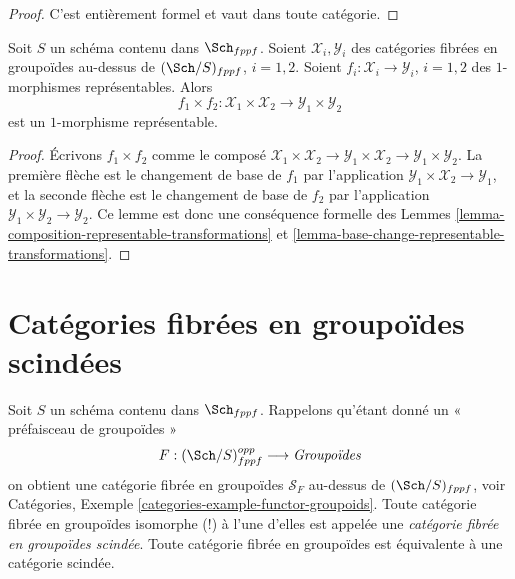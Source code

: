 \begin{proof}
C'est entièrement formel et vaut dans toute catégorie.
\end{proof}

\begin{lemma}
\label{lemma-product-representable-transformations}
Soit $S$ un schéma contenu dans $\Sch_{fppf}$.
Soient $\mathcal{X}_i, \mathcal{Y}_i$ des catégories fibrées en groupoïdes au-dessus de
$(\Sch/S)_{fppf}$, $i = 1, 2$.
Soient $f_i : \mathcal{X}_i \to \mathcal{Y}_i$, $i = 1, 2$
des $1$-morphismes représentables.
Alors
$$
f_1 \times f_2 :
\mathcal{X}_1 \times \mathcal{X}_2
\longrightarrow
\mathcal{Y}_1 \times \mathcal{Y}_2
$$
est un $1$-morphisme représentable.
\end{lemma}

\begin{proof}
Écrivons $f_1 \times f_2$ comme le composé
$\mathcal{X}_1 \times \mathcal{X}_2 \to
\mathcal{Y}_1 \times \mathcal{X}_2 \to
\mathcal{Y}_1 \times \mathcal{Y}_2$.
La première flèche est le changement de base de $f_1$ par l'application
$\mathcal{Y}_1 \times \mathcal{X}_2 \to \mathcal{Y}_1$, et la seconde flèche
est le changement de base de $f_2$ par l'application
$\mathcal{Y}_1 \times \mathcal{Y}_2 \to \mathcal{Y}_2$.
Ce lemme est donc une conséquence formelle des Lemmes
\ref{lemma-composition-representable-transformations}
et \ref{lemma-base-change-representable-transformations}.
\end{proof}



\section{Catégories fibrées en groupoïdes scindées}
\label{section-split}

\noindent
Soit $S$ un schéma contenu dans $\Sch_{fppf}$.
Rappelons qu'étant donné un « préfaisceau de groupoïdes »
$$
F : (\Sch/S)_{fppf}^{opp} \longrightarrow \textit{Groupoïdes}
$$
on obtient une catégorie fibrée en groupoïdes $\mathcal{S}_F$ au-dessus de
$(\Sch/S)_{fppf}$, voir
Catégories, Exemple \ref{categories-example-functor-groupoids}.
Toute catégorie fibrée en groupoïdes isomorphe (!) à l'une d'elles
est appelée une {\it catégorie fibrée en groupoïdes scindée}.
Toute catégorie fibrée en groupoïdes est équivalente à une catégorie scindée.

